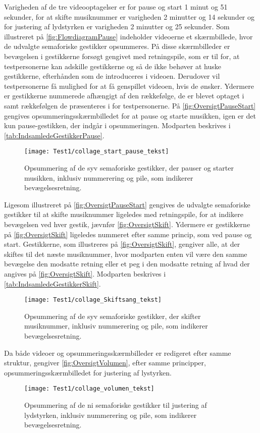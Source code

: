Varigheden af de tre videooptagelser er for pause og start 1 minut og 51 sekunder, for at skifte musiknummer er varigheden 2 minutter og 14 sekunder og for justering af lydstyrken er varigheden 2 minutter og 25 sekunder.\blankline
%
Som illustreret på \autoref{fig:FlowdiagramPause} indeholder videoerne et skærmbillede, hvor de udvalgte semaforiske gestikker opsummeres. På disse skærmbilleder er bevægelsen i gestikkerne forsøgt gengivet med retningspile, som er til for, at testpersonerne kan adskille gestikkerne  og så de ikke behøver at huske gestikkerne, efterhånden som de introduceres i videoen. Derudover vil testpersonerne få mulighed for at få genspillet videoen, hvis de ønsker. Ydermere er gestikkerne nummerede afhængigt af den rækkefølge, de er blevet optaget i samt rækkefølgen de præsenteres i for testpersonerne. På \autoref{fig:OversigtPauseStart} gengives opsummeringsskærmbilledet for at pause og starte musikken, igen er det kun pause-gestikken, der indgår i opsummeringen. Modparten beskrives i \autoref{tab:IndsamledeGestikkerPause}.  
% 
\begin{figure}[H]
	\centering
	\texttt{[image: Test1/collage\_start\_pause\_tekst]}
	\caption{Opsummering af de syv semaforiske gestikker, der pauser og starter musikken, inklusiv nummerering og pile, som indikerer bevægelsesretning.}
	\label{fig:OversigtPauseStart}
\end{figure}
\noindent
%
Ligesom illustreret på \autoref{fig:OversigtPauseStart} gengives de udvalgte semaforiske gestikker til at skifte musiknummer ligeledes med retningspile, for at indikere bevægelsen ved hver gestik, jævnfør \autoref{fig:OversigtSkift}. Ydermere er gestikkerne på \autoref{fig:OversigtSkift} ligeledes nummeret efter samme princip, som ved pause og start. Gestikkerne, som illustreres på \autoref{fig:OversigtSkift}, gengiver alle, at der skiftes til det næste musiknummer, hvor modparten enten vil være den samme bevægelse den modsatte retning eller et peg i den modsatte retning af hvad der angives på \autoref{fig:OversigtSkift}. Modparten beskrives i \autoref{tab:IndsamledeGestikkerSkift}.
%
\begin{figure}[H]
	\centering
	\texttt{[image: Test1/collage\_Skiftsang\_tekst]}
	\caption{Opsummering af de syv semaforiske gestikker, der skifter musiknummer, inklusiv nummerering og pile, som indikerer bevægelsesretning.}
	\label{fig:OversigtSkift}
\end{figure}
\noindent
%
Da både videoer og opsummeringsskærmbilleder er redigeret efter samme struktur, gengiver \autoref{fig:OversigtVolumen}, efter samme principper, opsummeringsskærmbilledet for justering af lystyrken. 
\newpage 
%
\begin{figure}[H]
	\centering
	\texttt{[image: Test1/collage\_volumen\_tekst]}
	\caption{Opsummering af de ni semaforiske gestikker til justering af lydstyrken, inklusiv nummerering og pile, som indikerer bevægelsesretning.}
	\label{fig:OversigtVolumen}
\end{figure}
\noindent
%
